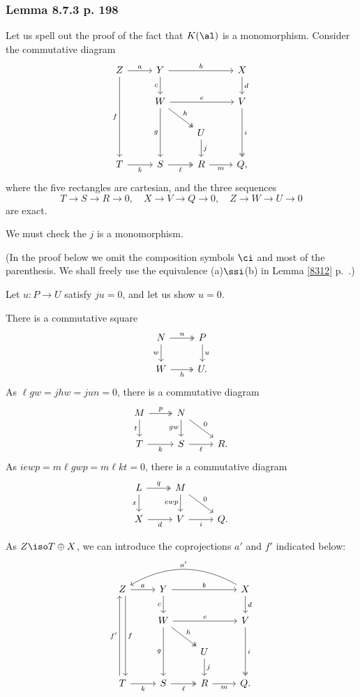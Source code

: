\documentclass[12pt]{article}
\theoremstyle{remark}
\theoremstyle{definition}
\begin{document}


\subsubsection{Lemma 8.7.3 p. 198}

Let us spell out the proof of the fact that $K(\al)$ is a monomorphism. Consider the commutative diagram 
$$
\begin{tikzcd} 
Z\ar[ddd,"f"']\ar[r,"a"]&Y\ar[d,"c"']\ar[rr,"b"]&&X\ar[d,"d"]\\ 
&W\ar[dd,"g"']\ar[rd,two heads,"h"]\ar[rr,"e"]&&V\ar[dd,two heads,"i"]\\ 
&&U\ar[d,"j"]\\ 
T\ar[r,"k"']&S\ar[r,two heads,"\ell"']&R\ar[r,"m"']&Q,
\end{tikzcd}
$$ 
where the five rectangles are cartesian, and the three sequences 
$$
T\to S\to R\to 0,\quad X\to V\to Q\to 0,\quad Z\to W\to U\to 0
$$ 
are exact. 

We must check the $j$ is a monomorphism. 

(In the proof below we omit the composition symbols $\ci$ and most of the parenthesis. We shall freely use the equivalence (a)$\ssi$(b) in Lemma \ref{8312} p.~.)

Let $u:P\to U$ satisfy $ju=0$, and let us show $u=0$. 

There is a commutative square 
$$
\begin{tikzcd} 
N\ar[d,"w"']\ar[r,two heads,"n"]&P\ar[d,"u"]\\ 
W\ar[r,two heads,"h"']&U.
\end{tikzcd}
$$ 
As $\ell gw=jhw=jun=0$, there is a commutative diagram 
$$
\begin{tikzcd} 
M\ar[d,"t"']\ar[r,two heads,"p"]&N\ar[d,"gw"']\ar[rd,"0"]\\ 
T\ar[r,"k"']&S\ar[r,"\ell"']&R.
\end{tikzcd}
$$ 
As $iewp=m\ell gwp=m\ell kt=0$, there is a commutative diagram 
$$
\begin{tikzcd} 
L\ar[d,"x"']\ar[r,two heads,"q"]&M\ar[d,"ewp"']\ar[rd,"0"]\\ 
X\ar[r,"d"']&V\ar[r,"i"']&Q.
\end{tikzcd}
$$

As $Z\iso T\oplus X$, we can introduce the coprojections $a'$ and $f'$ indicated below:
$$
\begin{tikzcd} 
Z\ar[ddd,xshift=0.7ex,"f"]\ar[r,"a"]&Y\ar[d,"c"']\ar[rr,"b"]&&X\ar[d,"d"]\ar[lll,bend right,"a'"']\\ 
&W\ar[dd,"g"']\ar[rd,two heads,"h"]\ar[rr,"e"]&&V\ar[dd,two heads,"i"]\\ 
&&U\ar[d,"j"]\\ 
T\ar[uuu,xshift=-0.7ex,"f'"]\ar[r,"k"']&S\ar[r,two heads,"\ell"']&R\ar[r,"m"']&Q.
\end{tikzcd}
$$ 
\end{document}
